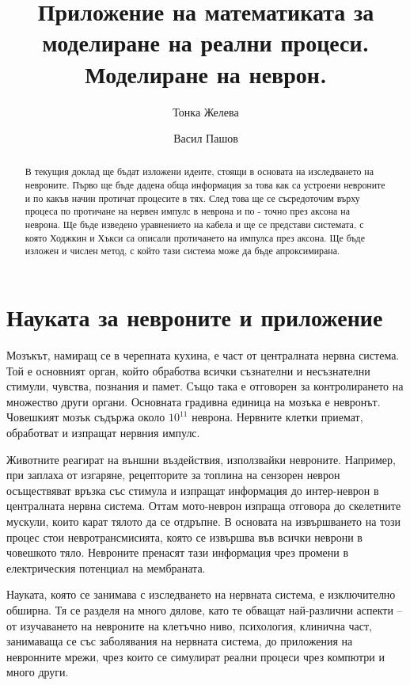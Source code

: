 \documentclass{article}
\title{Приложение на математиката за моделиране на реални процеси. Моделиране на неврон.}
\author{Тонка Желева \and Васил Пашов}
\numberwithin{equation}{section}
\begin{document}
\maketitle

\begin{abstract}
    В текущия доклад ще бъдат изложени идеите, стоящи в основата на изследването на невроните. Първо ще бъде дадена обща информация за това
    как са устроени невроните и по какъв начин протичат процесите в тях. След това ще се съсредоточим върху процеса по протичане на нервен
    импулс в неврона и по - точно през аксона на неврона. Ще бъде изведено уравнението на кабела и ще се представи системата, с
    която Ходжкин и Хъкси са описали протичането на импулса през аксона. Ще бъде изложен и числен метод, с който тази система може да бъде
    апроксимирана. 
\end{abstract}

\tableofcontents
\newpage

\section{Науката за невроните и приложение}

Мозъкът, намиращ се в черепната кухина, е част от централната нервна система. Той е основният орган, който обработва всички съзнателни и
несъзнателни стимули, чувства,  познания и памет. Също така е отговорен за контролирането на множество други органи. Основната градивна
единица на мозъка е невронът. Човешкият мозък съдържа около $10^{11}$ неврона. Нервните клетки приемат, обработват и изпращат нервния импулс.

Животните реагират на външни въздействия, използвайки невроните.  Например, при заплаха от изгаряне, рецепторите за топлина на сензорен
неврон осъществяват връзка със стимула и изпращат информация до интер-неврон в централната нервна система. Оттам мото-неврон изпраща
отговора до скелетните мускули, които карат тялото да се отдръпне. В основата на извършването на този процес стои невротрансмисията, която
се извършва във всички неврони в човешкото тяло. Невроните пренасят тази информация чрез промени в електрическия потенциал на мембраната.

Науката, която се занимава с изследването на нервната система, е изключително обширна. Тя се разделя на много дялове, като те обващат
най-различни аспекти -- от изучаването на невроните на клетъчно ниво, психология, клинична част, занимаваща се със заболявания на нервната
система, до приложения на невронните мрежи, чрез които се симулират реални процеси чрез компютри и много други.
\end{document}
